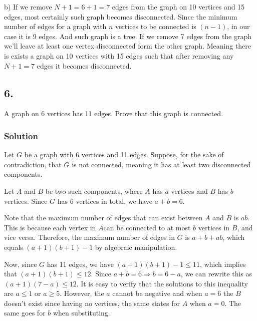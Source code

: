 \documentclass[a4paper]{article}
\begin{document}
\par b) If we remove \(N+1=6+1=7\) edges from the graph on 10 vertices and 15 edges, most certainly such graph becomes disconnected. Since the minimum number of edges for a graph with \(n\) vertices to be connected is \((n-1)\), in our case it is 9 edges. And such graph is a tree. If we remove 7 edges from the graph we'll leave at least one vertex disconnected form the other graph. Meaning there is exists a graph on 10 vertices with 15 edges such that after removing any \(N+1 = 7\) edges it becomes disconnected.\\

\subsection*{6. }
A graph on 6 vertices has 11 edges. Prove that this graph is connected.

\subsubsection*{Solution}

\par Let \(G\) be a graph with 6 vertices and 11 edges. Suppose, for the sake of contradiction, that 
\(G\) is not connected, meaning it has at least two disconnected components. \\
\par Let \(A\) and \(B\) be two such components, where \(A\) has \(a\) vertices and \(B\) has \(b\) vertices. Since \(G\) has 6 vertices in total, we have \(a+b=6\). \\
\par Note that the maximum number of edges that can exist between \(A\) and \(B\) is \(ab\). This is because each vertex in \(A\)can be connected to at most \(b\) vertices in \(B\), and vice versa. Therefore, the maximum number of edges in \(G\) is \(a+b+ab\), which equals \((a+1)(b+1)-1\) by algebraic manipulation. \\

\par Now, since \(G\) has 11 edges, we have \((a+1)(b+1)-1 \leqslant 11\), which implies that \((a+1)(b+1) \leqslant 12\). Since \(a+b=6 \Rightarrow b=6-a\), we can rewrite this as \((a+1)(7-a) \leqslant 12\). It is easy to verify that the solutions to this inequality are \(a\leqslant1\) or \(a\geqslant5 \). However, the \(a\) cannot be negative and when \(a=6\) the \(B\) doesn't exist since having no vertices, the same states for \(A\) when \(a=0\). The same goes for \(b\) when substituting.\\
\end{document}
